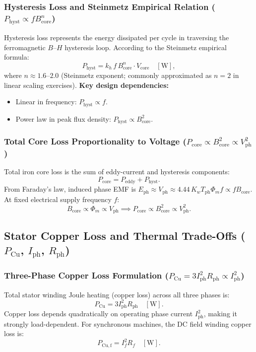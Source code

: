 \subsubsection{Hysteresis Loss and Steinmetz Empirical Relation ($P_{\mathrm{hyst}} \propto f B_{\mathrm{core}}^n$)}
Hysteresis loss represents the energy dissipated per cycle in traversing the ferromagnetic $B$--$H$ hysteresis loop.
According to the Steinmetz empirical formula:
\[
P_{\mathrm{hyst}} = k_h\,f\,B_{\mathrm{core}}^n\cdot V_{\mathrm{core}}\quad[\mathrm{W}],
\]
where $n \approx 1.6\text{--}2.0$ (Steinmetz exponent; commonly approximated as $n=2$ in linear scaling exercises).
\textbf{Key design dependencies:}
\begin{itemize}
  \item Linear in frequency: $P_{\mathrm{hyst}} \propto f$.
  \item Power law in peak flux density: $P_{\mathrm{hyst}} \propto B_{\mathrm{core}}^2$.
\end{itemize}

\subsubsection{Total Core Loss Proportionality to Voltage ($P_{\mathrm{core}} \propto B_{\mathrm{core}}^2 \propto V_{\mathrm{ph}}^2$)}
Total iron core loss is the sum of eddy-current and hysteresis components:
\[
P_{\mathrm{core}} = P_{\mathrm{eddy}} + P_{\mathrm{hyst}}.
\]
From Faraday's law, induced phase EMF is $E_{\mathrm{ph}} \approx V_{\mathrm{ph}} \approx 4.44\,K_w T_{\mathrm{ph}} \Phi_m f \propto f B_{\mathrm{core}}$.
At fixed electrical supply frequency $f$:
\[
B_{\mathrm{core}} \propto \Phi_m \propto V_{\mathrm{ph}}
\implies
P_{\mathrm{core}} \propto B_{\mathrm{core}}^2 \propto V_{\mathrm{ph}}^2.
\]

\subsection{Stator Copper Loss and Thermal Trade-Offs ($P_{\mathrm{Cu}}$, $I_{\mathrm{ph}}$, $R_{\mathrm{ph}}$)}

\subsubsection{Three-Phase Copper Loss Formulation ($P_{\mathrm{Cu}} = 3 I_{\mathrm{ph}}^2 R_{\mathrm{ph}} \propto I_{\mathrm{ph}}^2$)}
Total stator winding Joule heating (copper loss) across all three phases is:
\[
P_{\mathrm{Cu}} = 3 I_{\mathrm{ph}}^2 R_{\mathrm{ph}}\quad[\mathrm{W}].
\]
Copper loss depends quadratically on operating phase current $I_{\mathrm{ph}}^2$, making it strongly load-dependent.
For synchronous machines, the DC field winding copper loss is:
\[
P_{\mathrm{Cu,f}} = I_f^2 R_f\quad[\mathrm{W}].
\]

